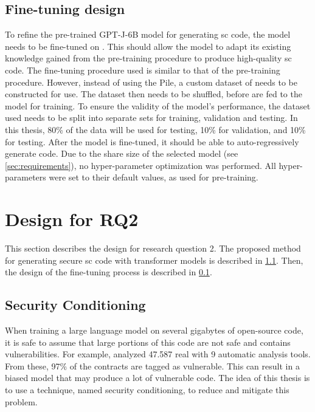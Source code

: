 \subsection{Fine-tuning design}
\label{sec:rq1-fine-tuning-design}
To refine the pre-trained GPT-J-6B model for generating \acrshort{sc} code, the model needs to be fine-tuned on . This should allow the model to adapt its existing knowledge gained from the pre-training procedure to produce high-quality \acrshort{sc} code. The fine-tuning procedure used is similar to that of the pre-training procedure. However, instead of using the Pile, a custom dataset of  needs to be constructed for use. The dataset then needs to be shuffled, before  are fed to the model for training. To ensure the validity of the model's performance, the dataset used needs to be split into separate sets for training, validation and testing. In this thesis, 80\% of the data will be used for testing, 10\% for validation, and 10\% for testing. After the model is fine-tuned, it should be able to auto-regressively generate  code. Due to the share size of the selected model (see \cref{sec:requirements}), no hyper-parameter optimization was performed. All hyper-parameters were set to their default values, as used for pre-training.

\section{Design for RQ2}
\label{sec:design-for-rq2}
This section describes the design for research question 2. The proposed method for generating secure \acrshort{sc} code with transformer models is described in \cref{sec:security-conditioning}. Then, the design of the fine-tuning process is described in \cref{sec:rq1-fine-tuning-design}.

\subsection{Security Conditioning}
\label{sec:security-conditioning}
When training a large language model on several gigabytes of open-source code, it is safe to assume that large portions of this code are not safe and contains vulnerabilities. For example, \textcite{durieux2020empirical} analyzed 47.587 real  with 9 automatic analysis tools. From these, 97\% of the contracts are tagged as vulnerable. This can result in a biased model that may produce a lot of vulnerable code. The idea of this thesis is to use a technique, named security conditioning, to reduce and mitigate this problem. 

